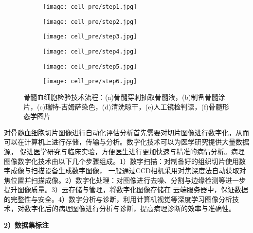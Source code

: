 \begin{figure}[htbp]
	\centering
	\begin{subfigure}{0.325\linewidth}
		\centering
		\texttt{[image: cell\_pre/step1.jpg]}
    \caption{}
	\end{subfigure}
	\centering
	\begin{subfigure}{0.325\linewidth}
		\centering
		\texttt{[image: cell\_pre/step2.jpg]}
    \caption{}
	\end{subfigure}
	\centering
	\begin{subfigure}{0.325\linewidth}
		\centering
		\texttt{[image: cell\_pre/step3.jpg]}
    \caption{}
	\end{subfigure}

	\centering
	\begin{subfigure}{0.325\linewidth}
		\centering
		\texttt{[image: cell\_pre/step4.jpg]}
    \caption{}
	\end{subfigure}
	\centering
	\begin{subfigure}{0.325\linewidth}
		\centering
		\texttt{[image: cell\_pre/step5.jpg]}
    \caption{}
	\end{subfigure}
	\centering
	\begin{subfigure}{0.325\linewidth}
		\centering
		\texttt{[image: cell\_pre/step6.jpg]}
    \caption{}
	\end{subfigure}
	\caption{骨髓血细胞检验技术流程：(a)骨髓穿刺抽取骨髓液，(b)制备骨髓涂片，(c)瑞特-吉姆萨染色，(d)清洗晾干，(e)人工镜检判读，(f)骨髓形态学图片}
	\label{fig:cell_pre}
\end{figure}

对骨髓血细胞切片图像进行自动化评估分析首先需要对切片图像进行数字化\cite{fuxinyan2022}，从而可以在计算机上进行存储，传输与分析。数字化技术可以为医学研究提供大量数据源，
促进医学研究与临床实验，方便医生进行更加快速与精准的病情分析。病理图像数字化技术由以下几个步骤组成。1）数字扫描：对制备好的组织切片使用数字成像与扫描设备生成数字图像，
一般通过CCD相机采用对焦深度法自动获取对焦位置并扫描成像。2）数字化处理：对图像进行去噪、分割与边缘检测等进一步提升图像质量。3）云存储与管理，将数字化图像存储在
云端服务器中，保证数据的完整性与安全。4）数字分析与诊断，利用计算机视觉等深度学习图像分析技术，对数字化后的病理图像进行分析与诊断，提高病理诊断的效率与准确性。

\textbf{2）数据集标注}

